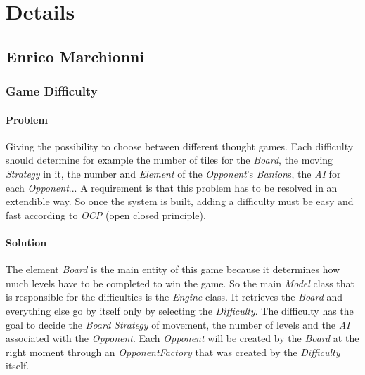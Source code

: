 \documentclass[12pt, a4paper]{report}
\theoremstyle{definition}
\begin{document}

\section{Details}

    \subsection*{Enrico Marchionni}

        \subsubsection{Game Difficulty}

            \paragraph{Problem}
            
            Giving the possibility to choose between different thought games.
            Each difficulty should determine for example the number of tiles for the \emph{Board}, the moving \emph{Strategy} in it,
            the number and \emph{Element} of the \emph{Opponent}'s \emph{Banion}s, the \emph{AI} for each \emph{Opponent}...
            A requirement is that this problem has to be resolved in an extendible way.
            So once the system is built, adding a difficulty must be easy and fast according to \emph{OCP} (open closed principle).

            \paragraph{Solution}

            The element \emph{Board} is the main entity of this game because it determines how much
            levels have to be completed to win the game. So the main \emph{Model} class that is responsible for
            the difficulties is the \emph{Engine} class. It retrieves the \emph{Board} and everything else go by itself
            only by selecting the \emph{Difficulty}. The difficulty has the goal to decide the \emph{Board} \emph{Strategy} of
            movement, the number of levels and the \emph{AI} associated with the \emph{Opponent}. Each \emph{Opponent} will
            be created by the \emph{Board} at the right moment through an \emph{OpponentFactory} that was created by the \emph{Difficulty}
            itself.
\end{document}
